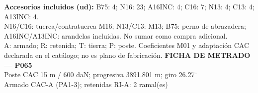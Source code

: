 \begingroup\scriptsize
\textbf{Accesorios incluidos (ud):} B75: 4; N16: 23; A16INC: 4; C16: 7; N13: 4; C13: 4; A13INC: 4.\\
N16/C16: tuerca/contratuerca M16; N13/C13: M13; B75: perno de abrazadera; A16INC/A13INC: arandelas incluidas. No sumar como compra adicional.\\
A: armado; R: retenida; T: tierra; P: poste. Coeficientes M01 y adaptación CAC declarada en el catálogo; no es plano de fabricación.
\endgroup\endgroup
\clearpage{}
\begingroup\small\setlength{\parskip}{3pt}\renewcommand{\arraystretch}{1.05}
\textbf{\large FICHA DE METRADO — P065}\\[4pt]
Poste CAC 15 m / 600 daN; progresiva 3891.801 m; giro 26.27\ensuremath{^\circ}\\
Armado CAC-A (PA1-3); retenidas RI-A: 2 ramal(es)\\
\begingroup\scriptsize
